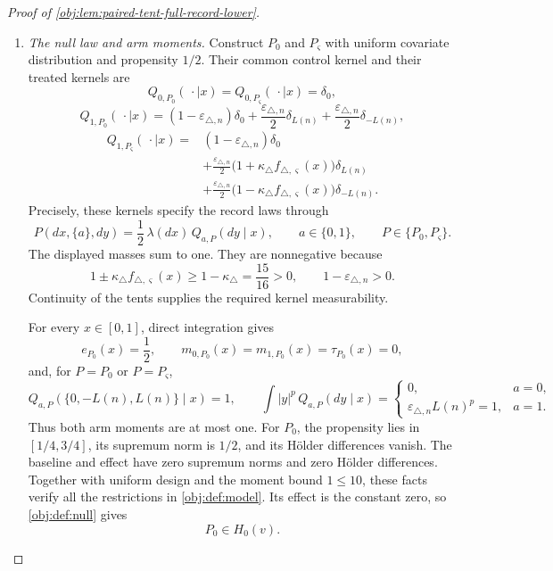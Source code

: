 \begin{proof}[Proof of \cref{obj:lem:paired-tent-full-record-lower}]
\begin{enumerate}
\item \emph{The null law and arm moments.}
Construct \(P_0\) and \(P_\varsigma\) with uniform covariate distribution and
propensity \(1/2\). Their common control kernel and their treated kernels are
\[
Q_{0,P_0}(\,\cdot\mid x)
=
Q_{0,P_\varsigma}(\,\cdot\mid x)=\delta_0,
\]
\[
Q_{1,P_0}(\,\cdot\mid x)
=
(1-\varepsilon_{\triangle,n})\delta_0
+\frac{\varepsilon_{\triangle,n}}2\delta_{L(n)}
+\frac{\varepsilon_{\triangle,n}}2\delta_{-L(n)},
\]
\[
\begin{aligned}
Q_{1,P_\varsigma}(\,\cdot\mid x)
={}&(1-\varepsilon_{\triangle,n})\delta_0\\
&+\frac{\varepsilon_{\triangle,n}}2
 \bigl(1+\kappa_\triangle f_{\triangle,\varsigma}(x)\bigr)\delta_{L(n)}\\
&+\frac{\varepsilon_{\triangle,n}}2
 \bigl(1-\kappa_\triangle f_{\triangle,\varsigma}(x)\bigr)\delta_{-L(n)}.
\end{aligned}
\]
Precisely, these kernels specify the record laws through
\[
P(dx,\{a\},dy)
=\frac12\,\lambda(dx)\,Q_{a,P}(dy\mid x),
\qquad
a\in\{0,1\},
\qquad
P\in\{P_0,P_\varsigma\}.
\]
The displayed masses sum to one. They are nonnegative because
\[
1\pm\kappa_\triangle f_{\triangle,\varsigma}(x)
\ge1-\kappa_\triangle=\frac{15}{16}>0,
\qquad
1-\varepsilon_{\triangle,n}>0.
\]
Continuity of the tents supplies the required kernel measurability.

For every \(x\in[0,1]\), direct integration gives
\[
e_{P_0}(x)=\frac12,
\qquad
m_{0,P_0}(x)=m_{1,P_0}(x)=\tau_{P_0}(x)=0,
\]
and, for \(P=P_0\) or \(P=P_\varsigma\),
\[
Q_{a,P}(\{0,-L(n),L(n)\}\mid x)=1,
\qquad
\int |y|^p\,Q_{a,P}(dy\mid x)
=
\begin{cases}
0,&a=0,\\
\varepsilon_{\triangle,n}L(n)^p=1,&a=1.
\end{cases}
\]
Thus both arm moments are at most one. For \(P_0\), the propensity lies in
\([1/4,3/4]\), its supremum norm is \(1/2\), and its Hölder differences vanish.
The baseline and effect have zero supremum norms and zero Hölder differences.
Together with uniform design and the moment bound \(1\le10\), these facts
verify all the restrictions in \cref{obj:def:model}. Its effect is the constant
zero, so \cref{obj:def:null} gives
\[
P_0\in H_0(v).
\]


\end{enumerate}
\end{proof}
